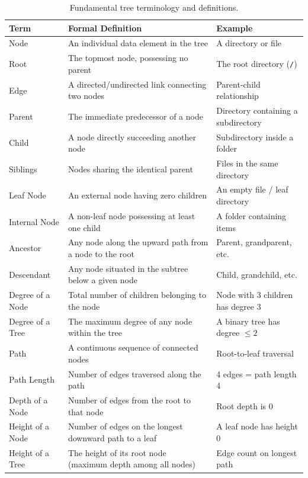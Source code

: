 \begin{table}[htbp]
\centering
\small
\begin{tabularx}{\textwidth}{l p{7.5cm} X}
\toprule
\textbf{Term} & \textbf{Formal Definition} & \textbf{Example} \\
\midrule
Node             & An individual data element in the tree                      & A directory or file \\
Root             & The topmost node, possessing no parent                      & The root directory (\texttt{/}) \\
Edge             & A directed/undirected link connecting two nodes             & Parent-child relationship \\
Parent           & The immediate predecessor of a node                         & Directory containing a subdirectory \\
Child            & A node directly succeeding another node                     & Subdirectory inside a folder \\
Siblings         & Nodes sharing the identical parent                          & Files in the same directory \\
Leaf Node        & An external node having zero children                       & An empty file / leaf directory \\
Internal Node    & A non-leaf node possessing at least one child               & A folder containing items \\
Ancestor         & Any node along the upward path from a node to the root      & Parent, grandparent, etc. \\
Descendant       & Any node situated in the subtree below a given node         & Child, grandchild, etc. \\
Degree of a Node & Total number of children belonging to the node              & Node with 3 children has degree 3 \\
Degree of a Tree & The maximum degree of any node within the tree              & A binary tree has degree $\leq 2$ \\
Path             & A continuous sequence of connected nodes                    & Root-to-leaf traversal \\
Path Length      & Number of edges traversed along the path                    & 4 edges = path length 4 \\
Depth of a Node  & Number of edges from the root to that node                  & Root depth is $0$ \\
Height of a Node & Number of edges on the longest downward path to a leaf      & A leaf node has height $0$ \\
Height of a Tree & The height of its root node (maximum depth among all nodes) & Edge count on longest path \\
\bottomrule
\end{tabularx}
\caption{Fundamental tree terminology and definitions.}
\end{table}

